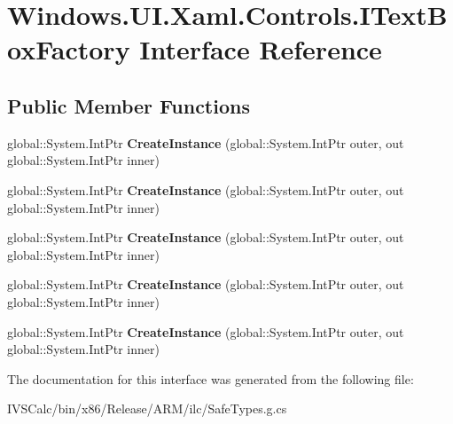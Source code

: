 \hypertarget{interface_windows_1_1_u_i_1_1_xaml_1_1_controls_1_1_i_text_box_factory}{}\section{Windows.\+U\+I.\+Xaml.\+Controls.\+I\+Text\+Box\+Factory Interface Reference}
\label{interface_windows_1_1_u_i_1_1_xaml_1_1_controls_1_1_i_text_box_factory}
\subsection*{Public Member Functions}
\begin{DoxyCompactItemize}
\item 
\mbox{\label{interface_windows_1_1_u_i_1_1_xaml_1_1_controls_1_1_i_text_box_factory_a98a0d10f87e79212bcddde5c789abd10}} 
global\+::\+System.\+Int\+Ptr {\bfseries Create\+Instance} (global\+::\+System.\+Int\+Ptr outer, out global\+::\+System.\+Int\+Ptr inner)
\item 
\mbox{\label{interface_windows_1_1_u_i_1_1_xaml_1_1_controls_1_1_i_text_box_factory_a98a0d10f87e79212bcddde5c789abd10}} 
global\+::\+System.\+Int\+Ptr {\bfseries Create\+Instance} (global\+::\+System.\+Int\+Ptr outer, out global\+::\+System.\+Int\+Ptr inner)
\item 
\mbox{\label{interface_windows_1_1_u_i_1_1_xaml_1_1_controls_1_1_i_text_box_factory_a98a0d10f87e79212bcddde5c789abd10}} 
global\+::\+System.\+Int\+Ptr {\bfseries Create\+Instance} (global\+::\+System.\+Int\+Ptr outer, out global\+::\+System.\+Int\+Ptr inner)
\item 
\mbox{\label{interface_windows_1_1_u_i_1_1_xaml_1_1_controls_1_1_i_text_box_factory_a98a0d10f87e79212bcddde5c789abd10}} 
global\+::\+System.\+Int\+Ptr {\bfseries Create\+Instance} (global\+::\+System.\+Int\+Ptr outer, out global\+::\+System.\+Int\+Ptr inner)
\item 
\mbox{\label{interface_windows_1_1_u_i_1_1_xaml_1_1_controls_1_1_i_text_box_factory_a98a0d10f87e79212bcddde5c789abd10}} 
global\+::\+System.\+Int\+Ptr {\bfseries Create\+Instance} (global\+::\+System.\+Int\+Ptr outer, out global\+::\+System.\+Int\+Ptr inner)
\end{DoxyCompactItemize}


The documentation for this interface was generated from the following file\+:\begin{DoxyCompactItemize}
\item 
I\+V\+S\+Calc/bin/x86/\+Release/\+A\+R\+M/ilc/Safe\+Types.\+g.\+cs\end{DoxyCompactItemize}
